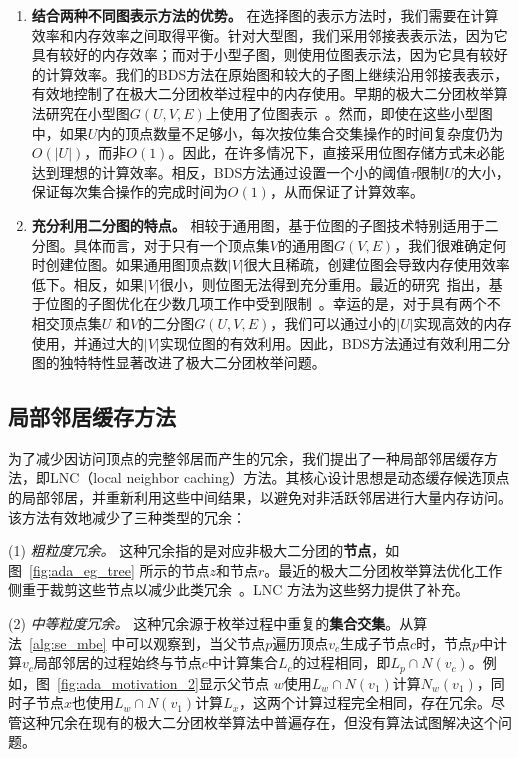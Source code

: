   \begin{enumerate}
    \item \textbf{结合两种不同图表示方法的优势。} 在选择图的表示方法时，我们需要在计算效率和内存效率之间取得平衡。针对大型图，我们采用邻接表表示法，因为它具有较好的内存效率；而对于小型子图，则使用位图表示法，因为它具有较好的计算效率。我们的BDS方法在原始图和较大的子图上继续沿用邻接表表示，有效地控制了在极大二分团枚举过程中的内存使用。早期的极大二分团枚举算法研究在小型图$G(U, V, E)$上使用了位图表示~\cite{lcmmbc07,iMBEA14}。然而，即使在这些小型图中，如果$U$内的顶点数量不足够小，每次按位集合交集操作的时间复杂度仍为$O(|U|)$，而非$O(1)$。因此，在许多情况下，直接采用位图存储方式未必能达到理想的计算效率。相反，BDS方法通过设置一个小的阈值$\tau$限制$U$的大小，保证每次集合操作的完成时间为$O(1)$，从而保证了计算效率。
    
    \item \textbf{充分利用二分图的特点。} 相较于通用图，基于位图的子图技术特别适用于二分图。具体而言，对于只有一个顶点集$V$的通用图$G(V,E)$，我们很难确定何时创建位图。如果通用图顶点数$|V|$很大且稀疏，创建位图会导致内存使用效率低下。相反，如果$|V|$很小，则位图无法得到充分重用。最近的研究~\cite{Graphset23}指出，基于位图的子图优化在少数几项工作中受到限制~\cite{Sandslash21,Kclique22,g2miner22}。幸运的是，对于具有两个不相交顶点集$U$ 和$V$的二分图$G(U,V,E)$，我们可以通过小的$|U|$实现高效的内存使用，并通过大的$|V|$实现位图的有效利用。因此，BDS方法通过有效利用二分图的独特特性显著改进了极大二分团枚举问题。
  
  \end{enumerate}



\subsection{局部邻居缓存方法}
\label{subsec:ada_design_2}


为了减少因访问顶点的完整邻居而产生的冗余，我们提出了一种局部邻居缓存方法，即LNC（local neighbor caching）方法。其核心设计思想是动态缓存候选顶点的局部邻居，并重新利用这些中间结果，以避免对非活跃邻居进行大量内存访问。该方法有效地减少了三种类型的冗余：

(1) \emph{\textit{粗粒度冗余。}}
这种冗余指的是对应非极大二分团的\textbf{节点}，如图~\ref{fig:ada_eg_tree} 所示的节点$z$和节点$r$。最近的极大二分团枚举算法优化工作侧重于裁剪这些节点以减少此类冗余~\cite{iMBEA14,PMBE20,ooMBE22}。LNC 方法为这些努力提供了补充。

(2) \emph{\textit{中等粒度冗余。}}
这种冗余源于枚举过程中重复的\textbf{集合交集}。从算法~\ref{alg:se_mbe} 中可以观察到，当父节点$p$遍历顶点$v_c$生成子节点$c$时，节点$p$中计算$v_c$局部邻居的过程始终与节点$c$中计算集合$L_c$的过程相同，即$L_p\cap N(v_c)$。例如，图~\ref{fig:ada_motivation_2}显示父节点 $w$使用$L_w\cap N(v_1)$计算$N_w(v_1)$，同时子节点$x$也使用$L_w\cap N(v_1)$计算$L_x$，这两个计算过程完全相同，存在冗余。尽管这种冗余在现有的极大二分团枚举算法中普遍存在，但没有算法试图解决这个问题。


